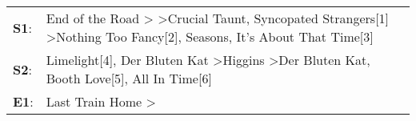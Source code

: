 \begin{supertabular}{p{0.03\textwidth}p{0.92\textwidth}}
 \textbf{S1}:  &  End of the Road\textsuperscript{} \textgreater {}\textsuperscript{} \textgreater \enspace Crucial Taunt\textsuperscript{}, \enspace Syncopated Strangers[1]\textsuperscript{} \textgreater \enspace Nothing Too Fancy[2]\textsuperscript{}, \enspace Seasons\textsuperscript{}, \enspace It's About That Time[3]\textsuperscript{}  \enspace  \\
 \textbf{S2}:  &                                                                          Limelight[4]\textsuperscript{}, \enspace Der Bluten Kat\textsuperscript{} \textgreater \enspace Higgins\textsuperscript{} \textgreater \enspace Der Bluten Kat\textsuperscript{}, \enspace Booth Love[5]\textsuperscript{}, \enspace All In Time[6]\textsuperscript{}  \enspace  \\
 \textbf{E1}:  &                                                                                                                                                                                                                                                                 Last Train Home\textsuperscript{} \textgreater {}\textsuperscript{}  \enspace  \\
\end{supertabular}
